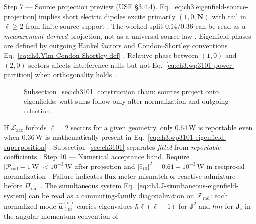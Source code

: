 Step 7 --- Source projection preview (USE §3.4.4). Eq.~\eqref{eq:ch3.eigenfield-source-projection} implies short electric dipoles excite primarily \((1,0,\mathbf{N})\) with tail in
\(\ell\ge2\) from finite source support \cite{stratton1941}. The worked split \(0.64/0.36\) can be read as a
\emph{measurement-derived} projection, not as a universal source law \cite{harrington2001}.
Eigenfield phases are defined by outgoing Hankel factors and Condon--Shortley conventions
Eq.~\eqref{eq:ch3.Ylm-Condon-Shortley-def} \cite{hansen1988}. Relative phase between \((1,0)\) and \((2,0)\) sectors affects
interference nulls but not Eq.~\eqref{eq:ch3.wp3101-power-partition} when orthogonality holds \cite{stratton1941}.
\begin{figure}[t]
\centering
{}
\caption{Subsection~\ref{sec:ch3101} construction chain: sources project onto eigenfields; watt sums follow only after normalization and outgoing selection.}
\label{fig:ch3.3101-source-projection}
\end{figure}
If \(\mathcal{L}_{\mathrm{acc}}\) forbids \(\ell=2\) sectors for a given geometry, only \(0.64\,\mathrm{W}\) is reportable even when
\(0.36\,\mathrm{W}\) is mathematically present in Eq.~\eqref{eq:ch3.wp3101-eigenfield-superposition} \cite{harrington2001}.
Subsection~\ref{sec:ch3101} separates \emph{fitted} from \emph{reportable} coefficients \cite{hansen1988}.
Step 10 --- Numerical acceptance band. Require \(|\mathcal{P}_{\mathrm{rad}}-1\,\mathrm{W}|<10^{-3}\,\mathrm{W}\) after projection and \(|\widehat{c}_{10}|^{2}=0.64\pm10^{-3}\,\mathrm{W}\)
in reciprocal normalization \cite{harrington2001}. Failure indicates flux meter mismatch or reactive admixture before
\(\Pi_{\mathrm{rad}}\) \cite{harrington2001}.
The simultaneous system Eq.~\eqref{eq:ch3.J-simultaneous-eigenfield-system} can be read as a commuting-family diagonalization on
\(\mathcal{F}_{\mathrm{rad}}\): each normalized mode \(\widehat{\mathbf{u}}_{\ell m}^{(\sigma)}\) carries eigenvalues
\(\hbar\ell(\ell+1)\) for \(\mathbf{J}^{2}\) and \(\hbar m\) for \(\mathbf{J}_{z}\) in the angular-momentum convention of
